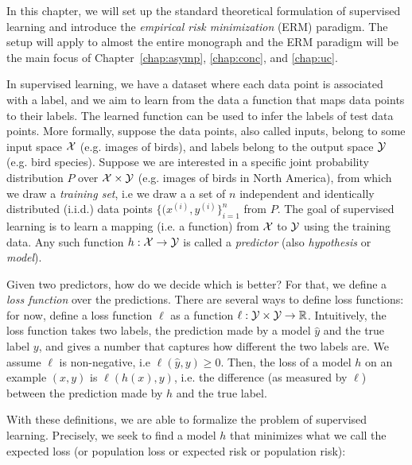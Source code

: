 
\setcounter{section}{0}



In this chapter, we will set up the standard theoretical formulation of supervised learning and introduce the \textit{empirical risk minimization} (ERM) paradigm. The setup will apply to almost the entire monograph and the ERM paradigm will be the main focus of Chapter~\ref{chap:asymp}, \ref{chap:conc}, and \ref{chap:uc}. 

\label{lec1:sec:sup-learn}
In supervised learning, we have a dataset where each data point is associated with a label, and we aim to learn from the data a function that maps data points to their labels. The learned  function can be used to infer the labels of test data points. More formally, suppose the data points, also called inputs,  belong to some input space $\mathcal X$ (e.g. images of birds), and labels belong to the output space $\mathcal Y$ (e.g. bird species). Suppose we are interested in a specific joint probability distribution $P$ over $\mathcal X \times \mathcal Y$ (e.g. images of birds in North America), from which we draw a \emph{training set}, i.e we draw a a set of $n$ independent and identically distributed (i.i.d.) data points $\{(x^{(i)}, y^{(i)}\}_{i=1}^n$ from $P$. The goal of supervised learning is to learn a mapping (i.e. a function) from $\mathcal X$ to $\mathcal Y$ using the training data. Any such function $h : \mathcal X \rightarrow \mathcal Y$ is called a \emph{predictor} (also \emph{hypothesis} or \emph{model}).

Given two predictors, how do we decide which is better? For that, we define a \emph{loss function} over the predictions. There are several ways to define loss functions: for now, define a loss function $\ell$ as a function $\ell : \mathcal Y \times \mathcal Y \rightarrow \mathbb R$. Intuitively, the loss function takes two labels, the prediction made by a model $\hat{y}$ and the true label $y$, and gives a number that captures how different the two labels are. We assume $\ell$ is non-negative, i.e $\ell(\hat{y}, y) \geq 0$. Then, the loss of a model $h$ on an example $(x, y)$ is $\ell(h(x), y)$, i.e. the difference (as measured by $\ell$) between the prediction made by $h$ and the true label.


With these definitions, we are able to formalize the problem of supervised learning. Precisely, we seek to find a model $h$ that minimizes what we call the expected loss (or population loss or expected risk or population risk):


